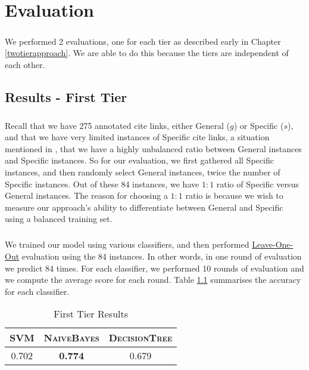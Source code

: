 \chapter{Evaluation}
\label{evaluation}
\paragraph{}
We performed 2 evaluations, one for each tier as described early in Chapter \ref{twotierapproach}. We are able to do this because the tiers are independent of each other.

\section{Results - First Tier}
\paragraph{}
Recall that we have 275 annotated cite links, either General ($g$) or Specific ($s$), and that we have very limited instances of Specific cite links, a situation mentioned in \cite{li2010negative}, that we have a highly unbalanced ratio between General instances and Specific instances. So for our evaluation, we first gathered all Specific instances, and then randomly select General instances, twice the number of Specific instances. Out of these 84 instances, we have $1:1$ ratio of Specific versus General instances. The reason for choosing a $1:1$ ratio is because we wish to measure our approach's ability to differentiate between General and Specific using a balanced training set.

\paragraph{}
We trained our model using various classifiers, and then performed \url{Leave-One-Out} evaluation using the 84 instances. In other words, in one round of evaluation we predict 84 times. For each classifier, we performed 10 rounds of evaluation and we compute the average score for each round. Table \ref{tab:firsttieresults} summarises the accuracy for each classifier.

\begin{table}[h]
	\center
	\begin{tabular}{ c  c  c }
		\textsc{SVM} & \textsc{NaiveBayes} & \textsc{DecisionTree} \\
		\hline
		0.702 & \textbf{0.774} & 0.679
	\end{tabular}
	\caption{First Tier Results}
	\label{tab:firsttieresults}
\end{table}


